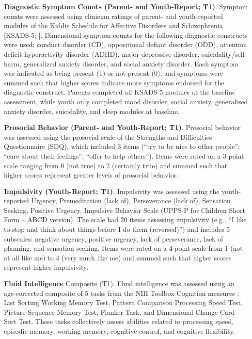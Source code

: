\documentclass[
  20pt,
  number,
  preprint,
  3p,
  twocolumn]{elsarticle}
\begin{document}
\textbf{Diagnostic Symptom Counts (Parent- and Youth-Report; T1)}.
Symptom counts were assessed using clinician ratings of parent- and
youth-reported modules of the Kiddie Schedule for Affective Disorders
and Schizophrenia {[}KSADS-5; \citep{kobak2013}{]}. Dimensional symptom
counts for the following diagnostic constructs were used: conduct
disorder (CD), oppositional defiant disorder (ODD), attention deficit
hyperactivity disorder (ADHD), major depressive disorder,
suicidality/self-harm, generalized anxiety disorder, and social anxiety
disorder. Each symptom was indicated as being present (1) or not present
(0), and symptoms were summed such that higher scores indicate more
symptoms endorsed for the diagnostic construct. Parents completed all
KSADS-5 modules at the baseline assessment, while youth only completed
mood disorder, social anxiety, generalized anxiety disorder,
suicidality, and sleep modules at baseline.

\textbf{Prosocial Behavior (Parent- and Youth-Report; T1)}. Prosocial
behavior was assessed using the prosocial scale of the Strengths and
Difficulties Questionnaire (SDQ), which included 3 items (``try to be
nice to other people''; ``care about their feelings''; ``offer to help
others''). Items were rated on a 3-point scale ranging from 0 (not true)
to 2 (certainly true) and summed such that higher scores represent
greater levels of prosocial behavior.

\textbf{Impulsivity (Youth-Report; T1)}. Impulsivity was assessed using
the youth-reported Urgency, Premeditation (lack of), Perseverance (lack
of), Sensation Seeking, Positive Urgency, Impulsive Behavior Scale
(UPPS-P for Children Short Form -- ABCD version). The scale had 20 items
assessing impulsivity (e.g., ``I like to stop and think about things
before I do them (reversed)'') and includes 5 subscales: negative
urgency, positive urgency, lack of perseverance, lack of planning, and
sensation seeking. Items were rated on a 4-point scale from 1 (not at
all like me) to 4 (very much like me) and summed such that higher scores
represent higher impulsivity.

\textbf{Fluid Intelligence} Composite (T1). Fluid intelligence was
assessed using an age-corrected composite of 5 tasks from the NIH
Toolbox Cognition measures \citep[see][ for a detailed
description]{luciana2018}: List Sorting Working Memory Test, Pattern
Comparison Processing Speed Test, Picture Sequence Memory Test, Flanker
Task, and Dimensional Change Card Sort Test. These tasks collectively
assess abilities related to processing speed, episodic memory, working
memory, cognitive control, and cognitive flexibility.
\end{document}
